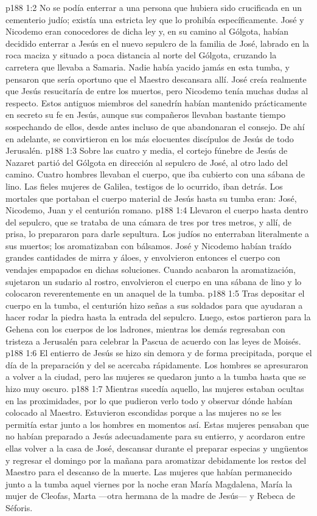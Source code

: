 \vs p188 1:2 No se podía enterrar a una persona que hubiera sido crucificada en un cementerio judío; existía una estricta ley que lo prohibía específicamente. José y Nicodemo eran conocedores de dicha ley y, en su camino al Gólgota, habían decidido enterrar a Jesús en el nuevo sepulcro de la familia de José, labrado en la roca maciza y situado a poca distancia al norte del Gólgota, cruzando la carretera que llevaba a Samaria. Nadie había yacido jamás en esta tumba, y pensaron que sería oportuno que el Maestro descansara allí. José creía realmente que Jesús resucitaría de entre los muertos, pero Nicodemo tenía muchas dudas al respecto. Estos antiguos miembros del sanedrín habían mantenido prácticamente en secreto su fe en Jesús, aunque sus compañeros llevaban bastante tiempo sospechando de ellos, desde antes incluso de que abandonaran el consejo. De ahí en adelante, se convirtieron en los más elocuentes discípulos de Jesús de todo Jerusalén.
\vs p188 1:3 Sobre las cuatro y media, el cortejo fúnebre de Jesús de Nazaret partió del Gólgota en dirección al sepulcro de José, al otro lado del camino. Cuatro hombres llevaban el cuerpo, que iba cubierto con una sábana de lino. Las fieles mujeres de Galilea, testigos de lo ocurrido, iban detrás. Los mortales que portaban el cuerpo material de Jesús hasta su tumba eran: José, Nicodemo, Juan y el centurión romano.
\vs p188 1:4 Llevaron el cuerpo hasta dentro del sepulcro, que se trataba de una cámara de tres por tres metros, y allí, de prisa, lo prepararon para darle sepultura. Los judíos no enterraban literalmente a sus muertos; los aromatizaban con bálsamos. José y Nicodemo habían traído grandes cantidades de mirra y áloes, y envolvieron entonces el cuerpo con vendajes empapados en dichas soluciones. Cuando acabaron la aromatización, sujetaron un sudario al rostro, envolvieron el cuerpo en una sábana de lino y lo colocaron reverentemente en un anaquel de la tumba.
\vs p188 1:5 Tras depositar el cuerpo en la tumba, el centurión hizo señas a sus soldados para que ayudaran a hacer rodar la piedra hasta la entrada del sepulcro. Luego, estos partieron para la Gehena con los cuerpos de los ladrones, mientras los demás regresaban con tristeza a Jerusalén para celebrar la Pascua de acuerdo con las leyes de Moisés.
\vs p188 1:6 El entierro de Jesús se hizo sin demora y de forma precipitada, porque el día de la preparación y del  se acercaba rápidamente. Los hombres se apresuraron a volver a la ciudad, pero las mujeres se quedaron junto a la tumba hasta que se hizo muy oscuro.
\vs p188 1:7 Mientras sucedía aquello, las mujeres estaban ocultas en las proximidades, por lo que pudieron verlo todo y observar dónde habían colocado al Maestro. Estuvieron escondidas porque a las mujeres no se les permitía estar junto a los hombres en momentos así. Estas mujeres pensaban que no habían preparado a Jesús adecuadamente para su entierro, y acordaron entre ellas volver a la casa de José, descansar durante el  preparar especias y ungüentos y regresar el domingo por la mañana para aromatizar debidamente los restos del Maestro para el descanso de la muerte. Las mujeres que habían permanecido junto a la tumba aquel viernes por la noche eran María Magdalena, María la mujer de Cleofas, Marta ---otra hermana de la madre de Jesús--- y Rebeca de Séforis.
